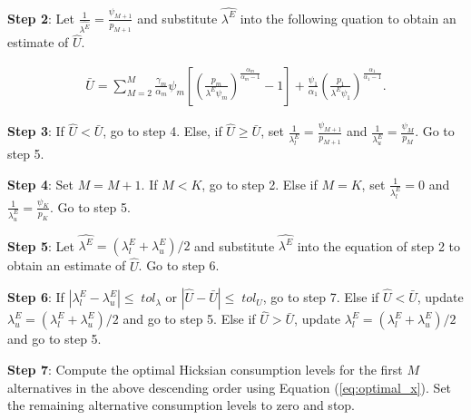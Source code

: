 \textbf{Step 2}: Let
\(\frac{1}{\hat{\lambda^E}} = \frac{\psi_{M+1}}{p_{M+1}}\) and
substitute \(\hat{\lambda^E}\) into the following quation to obtain an
estimate of \(\hat{U}\).

\begin{align}
\bar{U}=\sum_{M=2}^{M} \frac{\gamma_m}{\alpha_m}\psi_m \left[ \left( \frac{p_m}{\lambda^E \psi_m} \right)^\frac{\alpha_m}{\alpha_m-1} - 1 \right] + \frac{\psi_1}{\alpha_1}\left(\frac{p_1}{\lambda^E \psi_1} \right)^\frac{\alpha_1}{\alpha_1-1}.
\end{align}

\textbf{Step 3}: If \(\hat{U} < \bar{U}\), go to step 4. Else, if
\(\hat{U} \geq \bar{U}\), set
\(\frac{1}{\lambda_l^E}= \frac{\psi_{M+1}}{p_{M+1}}\) and
\(\frac{1}{\lambda_u^E}= \frac{\psi_{M}}{p_{M}}\). Go to step 5.

\textbf{Step 4}: Set \(M=M+1\). If \(M<K\), go to step 2. Else if
\(M=K\), set \(\frac{1}{\lambda_l^E}= 0\) and
\(\frac{1}{\lambda_u^E}= \frac{\psi_{K}}{p_{K}}\). Go to step 5.

\textbf{Step 5}: Let \(\hat{\lambda^E}= (\lambda_l^E+\lambda_u^E)/2\)
and substitute \(\hat{\lambda^E}\) into the equation of step 2 to obtain
an estimate of \(\hat{U}\). Go to step 6.

\textbf{Step 6}: If \(|\lambda_l^E-\lambda_u^E| \leq \; tol_{\lambda}\)
or \(|\hat{U}-\bar{U}| \leq \; tol_{U}\), go to step 7. Else if
\(\hat{U}<\bar{U}\), update \(\lambda^E_u= (\lambda_l^E+\lambda_u^E)/2\)
and go to step 5. Else if \(\hat{U}>\bar{U}\), update
\(\lambda^E_l= (\lambda_l^E+\lambda_u^E)/2\) and go to step 5.

\textbf{Step 7}: Compute the optimal Hicksian consumption levels for the
first \(M\) alternatives in the above descending order using Equation
(\ref{eq:optimal_x}). Set the remaining alternative consumption levels
to zero and stop.




\address{%
Patrick Lloyd-Smith\\
University of Saskatchewan\\
Department of Agricultural and Resource Economics Room 3D34, Agriculture
Building 51 Campus Drive Saskatoon, SK S7N 5A8 Canada\\
}


